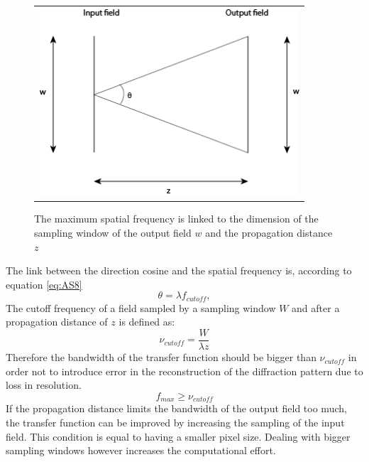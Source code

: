  \begin{figure}[h]
 	\begin{center}
 		\begin{tabular}{c}
 				\includegraphics[height=7cm]{cutofffrequency.png}
 		\end{tabular}
 	\end{center}
 	\caption	{ \label{fig:maxfrequency} 
 		The maximum spatial frequency is linked to the dimension of the sampling window of the output field $w$ and the propagation distance $z$ }
 \end{figure} 
 The link between the direction cosine and the spatial frequency is, according to equation \ref{eq:AS8}
 \begin{equation}
 \label{eq:BL13}
 \theta=\lambda f_{cutoff},
 \end{equation}
 The cutoff frequency of a field sampled by a sampling window $W$ and after a propagation distance of $z$ is defined as:
 \begin{equation}
 	\label{eq:BL14}
 	\nu_{cutoff}=\dfrac{W}{\lambda z}
 \end{equation}
 Therefore the bandwidth of the transfer function should be bigger than $\nu_{cutoff}$ in order not to introduce error in the reconstruction of the diffraction pattern due to loss in resolution.
 \begin{equation}
 \label{eq:BL15}
 f_{max}\geq\nu_{cutoff}
 \end{equation}
 If the propagation distance limits the bandwidth of the output field too much, the transfer function can be improved by increasing the sampling of the input field. This condition is equal to having a smaller pixel size. Dealing with bigger sampling windows however increases the computational effort. 


